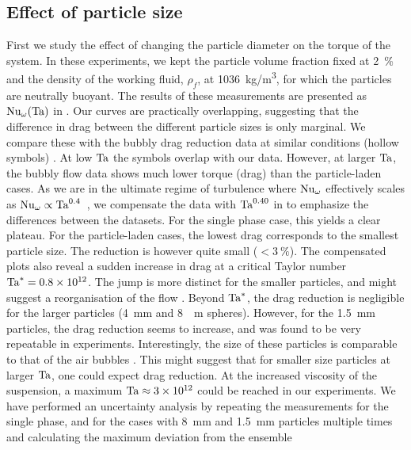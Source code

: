 \subsection{Effect of particle size}\label{subsec:sizeEffect}
First we study the effect of changing the particle diameter on the torque of
the system. In these experiments, we kept the particle volume fraction fixed
at \SI{2}{\percent} and the density of the working fluid, $\rho_f$, at
\SI{1036}{\kilogram/\metre \cubed}, for which the particles are neutrally
buoyant. The results of these measurements are presented as
$\text{Nu}_\omega(\text{Ta})$ in . Our curves are practically
overlapping, suggesting that the difference in drag between the different
particle sizes is only marginal. We compare these with the bubbly drag
reduction data at similar conditions (hollow symbols) 
\citep{Verschoof2016,vanGils2013,vandenBerg2005}. At low $\text{Ta}$ the symbols
overlap with our data. However, at larger $\text{Ta}$, the bubbly flow data shows
much lower torque (drag) than the particle-laden cases. As we are in the
ultimate regime of turbulence where $\text{Nu}_\omega$ effectively scales as
$\text{Nu}_\omega \propto \text{Ta}^{0.4}$~\citep{Huisman2012,Ostilla-Monico2013}, we
compensate the data with $\text{Ta}^{0.40}$ in  to
emphasize the differences between the datasets. For the single phase
case, this yields a clear plateau. For the particle-laden cases, the lowest
drag corresponds to the smallest particle size. The reduction is however quite
small ($<\SI{3}{\percent}$). The compensated plots also reveal a sudden
increase in drag at a critical Taylor number $\text{Ta}^* =\num{0.8e12}$. The jump
is more distinct for the smaller particles, and might suggest a reorganisation
of the flow \citep{Huisman2014}. Beyond $\text{Ta}^*$, the drag reduction is
negligible for the larger particles (\SI{4}{\milli \metre} and \SI{8}{\milli
\metre} spheres). However, for the \SI{1.5}{\milli\metre} particles, the drag
reduction seems to increase, and was found to be very repeatable in
experiments. Interestingly, the size of these particles is comparable to that
of the air bubbles \citep{vanGils2013}.  This might suggest that for smaller
size particles at larger $\text{Ta}$, one could expect drag reduction. At the
increased viscosity of the suspension, a maximum $\text{Ta} \approx 3 \times
10^{12}$ could be reached in our experiments.   We have performed an
uncertainty analysis by repeating the measurements for the single phase, and
for the cases with \SI{8}{\milli\metre} and \SI{1.5}{\milli\metre} particles
multiple times and calculating the maximum deviation from the ensemble
